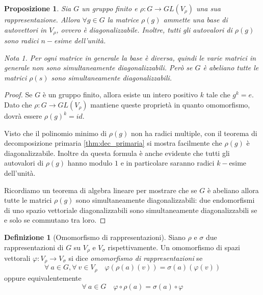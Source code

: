 \documentclass[11pt]{article}
\theoremstyle{plain}
\newtheorem{prop}[thm]{Proposizione}
\theoremstyle{definition}
\newtheorem{defn}{Definizione}[section]
\theoremstyle{remark}
\newtheorem*{note}{Nota}
\begin{document}
\begin{prop}
Sia $G$ un gruppo finito e $\rho: G \to GL(V_\rho)$ una sua rappresentazione. Allora $\forall g \in G$ la matrice $\rho(g)$ ammette una base di autovettori in $V_\rho$, ovvero è diagonalizzabile. Inoltre, tutti gli autovalori di $\rho(g)$ sono radici $n-$esime dell'unità.

\begin{note} Per ogni matrice in generale la base è diversa, quindi le varie matrici in generale \emph{non} sono simultaneamente diagonalizzabili.
Però se $G$ è abeliano tutte le matrici $\rho(s)$ sono simultaneamente diagonalizzabili.
\end{note}
\label{prop:diagonalizzabilita rappresentazioni}
\end{prop}

\begin{proof} Se $G$ è un gruppo finito, allora esiste un intero positivo $k$ tale che $g^k = e$. Dato che $\rho:G\to GL(V_\rho)$ mantiene queste proprietà in quanto omomorfismo, dovrà essere $\rho(g)^k = id$.

Visto che il polinomio minimo di $\rho(g)$ non ha radici multiple, con il teorema di decomposizione primaria \eqref{thm:dec_primaria} si mostra facilmente che $\rho(g)$ è diagonalizzabile. Inoltre da questa formula è anche evidente che tutti gli autovalori di $\rho(g)$ hanno modulo $1$ e in particolare saranno radici $k-$esime dell'unità.

Ricordiamo un teorema di algebra lineare per mostrare che se $G$ è abeliano allora
tutte le matrici $\rho(g)$ sono simultaneamente diagonalizzabili:
due endomorfismi di uno spazio vettoriale diagonalizzabili sono simultaneamente diagonalizzabili se e solo se commutano tra loro.
\end{proof}




\begin{defn}[Omomorfismo di rappresentazioni]
Siano $\rho$ e $\sigma$ due rappresentazioni di $G$ su $V_{\rho}$ e $V_{\sigma}$ rispettivamente. Un omomorfismo di spazi vettorali $\varphi:V_{\rho}\to V_{\sigma}$ si dice \textit{omomorfismo di rappresentazioni} se
\[
	\forall\ a\in G, \forall\ v\in V_{\rho}\quad \varphi(\rho(a)(v)) = \sigma(a)(\varphi(v))
\]
oppure equivalentemente
\[
	\forall\ a\in G\quad \varphi\circ \rho(a) = \sigma(a)\circ \varphi
\]






\end{defn}
\end{document}
